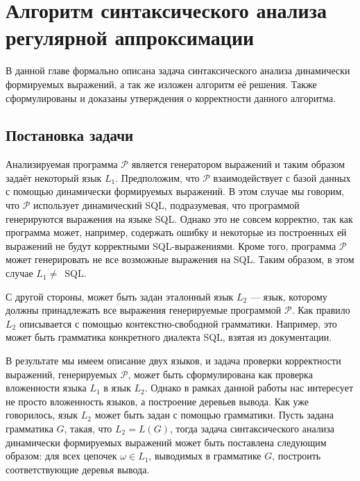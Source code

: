 \chapter{Алгоритм синтаксического анализа регулярной аппроксимации} \label{AlgoDescr}

В данной главе формально описана задача синтаксического анализа динамически формируемых выражений, а так же изложен алгоритм её решения. Также сформулированы и доказаны утверждения о корректности данного алгоритма.

\section{Постановка задачи}

Анализируемая программа $\mathcal{P}$ является генератором выражений и таким образом задаёт некоторый язык $L_1$. Предположим, что $\mathcal{P}$ взаимодействует с базой данных с помощью динамически формируемых выражений. В этом случае мы говорим, что $\mathcal{P}$ использует динамический SQL, подразумевая, что программой генерируются выражения на языке SQL. Однако это не совсем корректно, так как программа может, например, содержать ошибку и некоторые из построенных ей выражений не будут корректными SQL-выражениями. Кроме того, программа $\mathcal{P}$ может генерировать не все возможные выражения на SQL. Таким образом, в этом случае $L_1\neq$~SQL.

С другой стороны, может быть задан эталонный язык $L_2$ --- язык, которому должны принадлежать все выражения генерируемые программой $\mathcal{P}$. Как правило $L_2$ описывается с помощью контекстно-свободной грамматики. Например, это может быть грамматика конкретного диалекта SQL, взятая из документации.

В результате мы имеем описание двух языков, и задача проверки корректности выражений, генерируемых $\mathcal{P}$, может быть сформулирована как проверка вложенности языка $L_1$ в язык $L_2$. Однако в рамках данной работы нас интересует не просто вложенность языков, а построение деревьев вывода. Как уже говорилось, язык $L_2$ может быть задан с помощью грамматики. Пусть задана грамматика $G$, такая, что $L_2 = L(G)$, тогда задача синтаксического анализа динамически формируемых выражений может быть поставлена следующим образом: для всех цепочек $\omega \in L_1$, выводимых в грамматике $G$, построить соответствующие деревья вывода.

